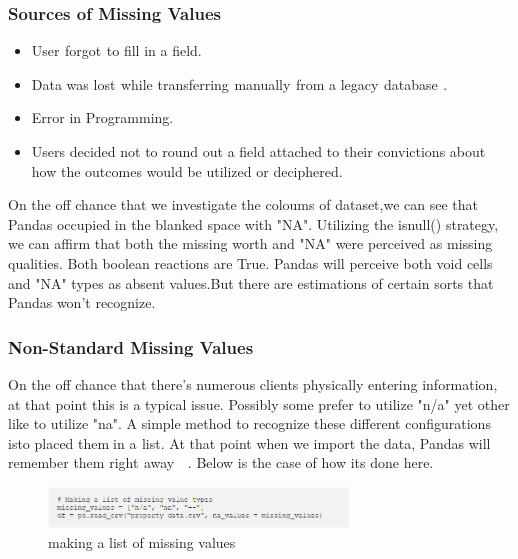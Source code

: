 \documentclass[oneside,12pt]{Classes/VTU}
\begin{document}
	\subsubsection{Sources of Missing Values}
	\begin{itemize}
		\item User\tiny\textcolor{white}{s}\normalsize forgot\tiny\textcolor{white}{s}\normalsize to fill in a field.
		\item Data was lost\tiny\textcolor{white}{s}\normalsize while transferring\tiny\textcolor{white}{s}\normalsize manually\tiny\textcolor{white}{s}\normalsize from a legacy\tiny\textcolor{white}{s}\normalsize database\tiny\textcolor{white}{s}\normalsize.
		\item Error in Programming.
		\item Users decided not to round out a field attached to their convictions about how the outcomes would be utilized or deciphered.
	\end{itemize}
	On the off chance that we investigate the coloums of dataset,we can see that Pandas occupied in the blanked space with "NA". Utilizing the isnull() strategy, we can affirm that both the missing worth and "NA" were perceived as missing qualities. Both boolean reactions are True. Pandas will perceive both void cells and "NA" types as absent values.But there are estimations of certain sorts that Pandas won't recognize.
	\subsubsection{Non-Standard Missing Values}
	On the off chance that there's numerous clients physically entering information, at that point this is a typical issue. Possibly some prefer to utilize "n/a" yet other like to utilize "na". A simple method to recognize these different configurations isto placed them\tiny\textcolor{white}{!}\normalsize in a\tiny\textcolor{white}{s}\normalsize list. At that point when we import the data, Pandas will remember them right\tiny\textcolor{white}{s}\normalsize away\tiny\textcolor{white}{ed}\normalsize . Below is the case of how its done here.
	\begin{figure}
		\begin{center}
			\includegraphics[width=8cm]{images/datacleaning.PNG}
			\caption{making a list of missing values}
		\end{center}
	\end{figure}
	
\end{document}

